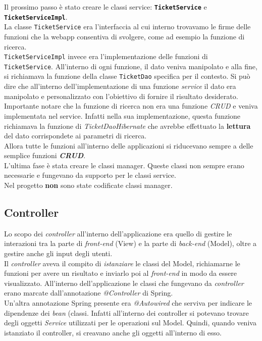 \noindent
Il prossimo passo è stato creare le classi service: \texttt{\textbf{TicketService}} e \texttt{\textbf{TicketServiceImpl}}.\\
La classe \texttt{TicketService} era l'interfaccia al cui interno trovavamo le firme delle funzioni che la webapp consentiva di svolgere, come ad esempio la funzione di ricerca. \\
\texttt{TicketServiceImpl} invece era l'implementazione delle funzioni di \texttt{TicketService}. All'interno di ogni funzione, il dato veniva manipolato e alla fine, si richiamava la funzione della classe \texttt{TicketDao} specifica per il contesto. 
Si può dire che all'interno dell'implementazione di una funzione \textit{service} il dato era manipolato e personalizzato con l'obiettivo di fornire il risultato desiderato.\\

\noindent
Importante notare che la funzione di ricerca non era una funzione \textit{CRUD} e veniva implementata nel service. Infatti nella sua implementazione, questa funzione richiamava la funzione di \textit{TicketDaoHibernate} che avrebbe effettuato la \textbf{lettura} del dato corrispondete ai parametri di ricerca.\\

\noindent
Allora tutte le funzioni all'interno delle applicazioni si riducevano sempre a delle semplice funzioni \textit{\textbf{CRUD}}.\\

\noindent
L'ultima fase è stata creare le classi manager. Queste classi non sempre erano necessarie e fungevano da supporto per le classi service. \\
Nel progetto \textbf{non} sono state codificate classi manager.

\subsection*{Controller}
Lo scopo dei \textit{controller} all'interno dell'applicazione era quello di gestire le interazioni tra la parte di \textit{front-end} (View) e la parte di \textit{back-end} (Model), oltre a gestire anche gli input degli utenti.\\

\noindent
Il \textit{controller} aveva il compito di \textit{istanziare} le classi del Model, richiamarne le funzioni per avere un risultato e inviarlo poi al \textit{front-end} in modo da essere visualizzato.
All'interno dell'applicazione le classi che fungevano da \textit{controller} erano marcate dall'annotazione \textit{@Controller} di Spring.\\
Un'altra annotazione Spring presente era \textit{@Autowired} che serviva per indicare le dipendenze dei \textit{bean} (classi. Infatti all'interno dei controller si potevano trovare degli oggetti \textit{Service} utilizzati per le operazioni sul Model. Quindi, quando veniva istanziato il controller, si creavano anche gli oggetti all'interno di esso.\\

